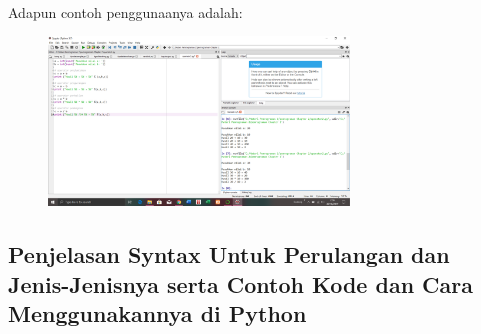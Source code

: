 \documentclass{article}
\begin{document}
\paragraph{} Adapun contoh penggunaanya adalah:
\begin{figure}[h]
                \centerline{\includegraphics[width=8cm]{figures/operator2.PNG}}
        \end{figure}
\subsection{Penjelasan Syntax Untuk Perulangan dan Jenis-Jenisnya serta Contoh Kode dan Cara Menggunakannya di Python}
\end{document}
